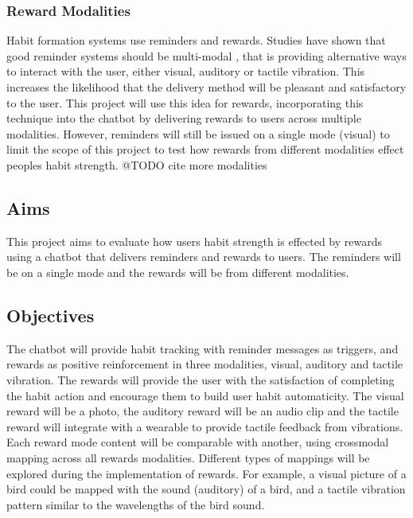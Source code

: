 \subsubsection*{Reward Modalities}
Habit formation systems use reminders and rewards. Studies have shown that good reminder systems should be multi-modal \cite{article_designing_multimodal_reminders_for_home}, that is providing alternative ways to interact with the user, either visual, auditory or tactile vibration. This increases the likelihood that the delivery method will be pleasant and satisfactory to the user. This project will use this idea for rewards, incorporating this technique into the chatbot by delivering rewards to users across multiple modalities. However, reminders will still be issued on a single mode (visual) to limit the scope of this project to test how rewards from different modalities effect peoples habit strength.
@TODO cite more modalities

\subsection*{Aims}
This project aims to evaluate how users habit strength is effected by rewards using a chatbot that delivers reminders and rewards to users. The reminders will be on a single mode and the rewards will be from different modalities.

\subsection*{Objectives}
The chatbot will provide habit tracking with reminder messages as triggers, and rewards as positive reinforcement in three modalities, visual, auditory and tactile vibration.\newline
\newline
The rewards will provide the user with the satisfaction of completing the habit action and encourage them to build user habit automaticity. The visual reward will be a photo, the auditory reward will be an audio clip and the tactile reward will integrate with a wearable to provide tactile feedback from vibrations. Each reward mode content will be comparable with another, using crossmodal mapping across all rewards modalities. Different types of mappings will be explored during the implementation of rewards. For example, a visual picture of a bird could be mapped with the sound (auditory) of a bird, and a tactile vibration pattern similar to the wavelengths of the bird sound.

